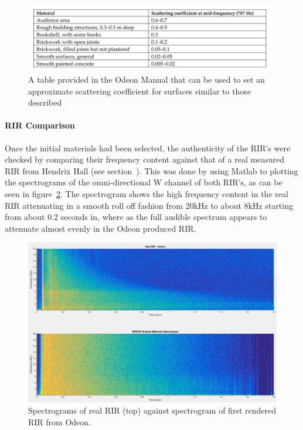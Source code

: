 \documentclass[../../main.tex]{subfiles}
\begin{document}
			\begin{figure}[H]
				\center\includegraphics[scale = 0.3]{Sections/Implementation/Odeon/images/scatteringCoefficients.png}
				\caption{A table provided in the Odeon Manual \cite{odeonManual} that can be used to set an approximate scattering coefficient for surfaces similar to those described}
				\label{odeonTable}
			\end{figure}
		
		\paragraph{RIR Comparison}

			Once the initial materials had been selected, the authenticity of the \ac{RIR}'s were checked by comparing their frequency content against that of a real measured \ac{RIR} from Hendrix Hall (see section~). This was done by using Matlab to plotting the spectrograms of the omni-directional W channel of both \ac{RIR}'s, as can be seen in figure~\ref{compareOriginal}. The spectrogram shows the high frequency content in the real \ac{RIR} attenuating in a smooth roll off fashion from 20kHz to about 8kHz starting from about 0.2 seconds in, where as the full audible spectrum appears to attenuate almost evenly in the Odeon produced \ac{RIR}.

			\begin{figure}[H]
				\center\includegraphics[scale = 0.3]{Sections/Implementation/Odeon/images/MaterialCompare/OriginalMaterials/original.png}
				\caption{Spectrograms of real \ac{RIR} (top) against spectrogram of first rendered \ac{RIR} from Odeon.}
				\label{compareOriginal}
			\end{figure}
\end{document}
